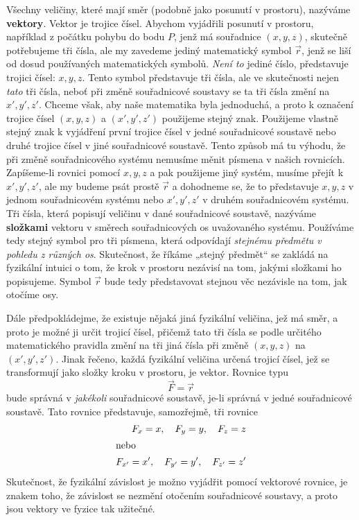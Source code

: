     Všechny veličiny, které mají směr (podobně jako posunutí v prostoru), nazýváme \textbf{vektory}.
    Vektor je trojice čísel. Abychom vyjádřili posunutí v prostoru, například z počátku pohybu do
    bodu \(P\), jenž má souřadnice \((x, y, z)\), skutečně potřebujeme tři čísla, ale my zavedeme
    jediný matematický symbol \(\vec{r}\), jenž se liší od dosud používaných matematických symbolů.
    \emph{Není to} jediné číslo, představuje trojici čísel: \(x, y, z\). Tento symbol představuje
    tři čísla, ale ve skutečnosti nejen \emph{tato} tři čísla, neboť při změně souřadnicové soustavy
    se ta tři čísla změní na \(x', y', z'\). Chceme však, aby naše matematika byla jednoduchá, a
    proto k označení trojice čísel \((x, y, z)\) a \((x', y', z')\) použijeme stejný znak. Použijeme
    vlastně stejný znak k vyjádření první trojice čísel v jedné souřadnicové soustavě nebo druhé
    trojice čísel v jiné souřadnicové soustavě. Tento způsob má tu výhodu, že při změně
    souřadnicového systému nemusíme měnit písmena v našich rovnicích. Zapíšeme-li rovnici pomocí
    \(x, y, z\) a pak použijeme jiný systém, musíme přejít k \(x', y', z'\), ale my budeme psát
    prostě \(\vec{r}\) a dohodneme se, že to představuje \(x, y, z\) v jednom souřadnicovém systému
    nebo \(x', y', z'\) v druhém souřadnicovém systému. Tři čísla, která popisují veličinu v dané
    souřadnicové soustavě, nazýváme \textbf{složkami} vektoru v směrech souřadnicových os
    uvažovaného systému. Používáme tedy stejný symbol pro tři písmena, která odpovídají
    \emph{stejnému předmětu v pohledu z různých os}. Skutečnost, že říkáme „stejný předmět“ se
    zakládá na fyzikální intuici o tom, že krok v prostoru nezávisí na tom, jakými složkami ho
    popisujeme. Symbol \(\vec{r}\) bude tedy představovat stejnou věc nezávisle na tom, jak otočíme
    osy.
    
    Dále předpokládejme, že existuje nějaká jiná fyzikální veličina, jež má směr, a proto je možné 
    ji určit trojicí čísel, přičemž tato tři čísla se podle určitého matematického pravidla změní 
    na tři jiná čísla při změně \((x, y, z)\) na \((x', y', z')\). Jinak řečeno, každá fyzikální 
    veličina určená trojicí čísel, jež se transformují jako složky kroku v prostoru, je vektor. 
    Rovnice typu
    \begin{equation*}
     \vec{F} = \vec{r}
    \end{equation*}
    bude správná v \emph{jakékoli} souřadnicové soustavě, je-li správná v jedné souřadnicové 
    soustavě. Tato rovnice představuje, samozřejmě, tři rovnice
    \begin{align*}
      F_x = x,     \quad F_y = y,     \quad F_z = z       \\
      \shortintertext{nebo}
      F_{x'} = x', \quad F_{y'} = y', \quad F_{z'} = z'   \\
    \end{align*}
    Skutečnost, že fyzikální závislost je možno vyjádřit pomocí vektorové rovnice, je znakem toho, 
    že závislost se nezmění otočením souřadnicové soustavy, a proto jsou vektory ve fyzice tak 
    užitečné.
    
